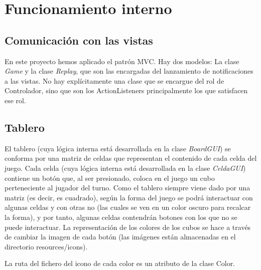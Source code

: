 \documentclass[14pt]{extreport}
\begin{document}
\section*{Funcionamiento interno}

\subsection*{Comunicación con las vistas}
En este proyecto hemos aplicado el patrón MVC. Hay dos modelos: La clase \textit{Game} y la clase \textit{Replay}, que son las encargadas del lanzamiento de notificaciones a las vistas. No hay explícitamente una clase que se encargue del rol de Controlador, sino que son los ActionListeners principalmente los que satisfacen ese rol.

\subsection*{Tablero}
El tablero (cuya lógica interna está desarrollada en la clase \textit{BoardGUI}) se conforma por una matriz de celdas que representan el contenido de cada celda del juego. Cada celda (cuya lógica interna está desarrollada en la clase \textit{CeldaGUI}) contiene un botón que, al ser presionado, coloca en el juego un cubo perteneciente al jugador del turno. Como el tablero siempre viene dado por una matriz (es decir, es cuadrado), según la forma del juego se podrá interactuar con algunas celdas y con otras no (las cuales se ven en un color oscuro para recalcar la forma), y por tanto, algunas celdas contendrán botones con los que no se puede interactuar. La representación de los colores de los cubos se hace a través de cambiar la imagen de cada botón (las imágenes están almacenadas en el directorio resources/icons).

La ruta del fichero del icono de cada color es un atributo de la clase Color.
\end{document}
